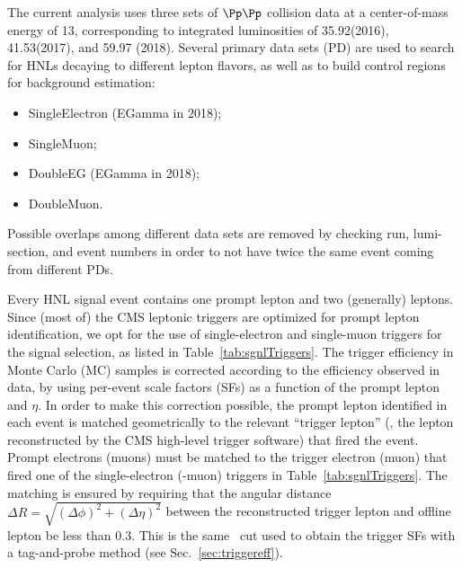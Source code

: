 The current analysis uses three sets of $\Pp\Pp$ collision data at a
center-of-mass energy of 13\TeV, corresponding to integrated
luminosities of 35.92\fbinv (2016), 41.53\fbinv (2017), and 59.97\fbinv
(2018). Several primary data sets (PD) are used to search for HNLs decaying
to different lepton flavors, as well as to build control regions for
background estimation:
\begin{itemize}
\item SingleElectron (EGamma in 2018);
\item SingleMuon;
\item DoubleEG (EGamma in 2018);
\item DoubleMuon.
\end{itemize}
Possible overlaps among different data sets are
removed by checking run, lumi-section, and event numbers in order to not have twice the same event coming from different PDs.

Every HNL signal event contains one prompt lepton and two (generally)
\displ leptons. Since (most of) the CMS leptonic triggers are
optimized for prompt lepton identification,
we opt for the use of single-electron and single-muon triggers for the
signal selection, as listed in Table~\ref{tab:sgnlTriggers}.
The trigger efficiency in  Monte Carlo (MC) samples is corrected
according to the efficiency observed in data, by using per-event scale
factors (SFs) as a function of the prompt lepton \pt and $\eta$.
In order to make this correction possible, the prompt lepton
identified in each event is matched geometrically to the relevant
``trigger lepton'' (\ie, the lepton reconstructed by the CMS
high-level trigger software) that fired the event. Prompt electrons
(muons) must be matched to the trigger electron (muon) that fired one
of the single-electron (-muon) triggers in
Table~\ref{tab:sgnlTriggers}.
The matching is ensured by requiring that the angular distance
\(\Delta R=\sqrt{\left(\Delta\phi\right)^2+\left(\Delta\eta\right)^2}\) 
between the reconstructed trigger lepton and offline lepton be less
than 0.3. This is the same \DR\ cut used to obtain the trigger SFs
with a tag-and-probe method (see Sec.~\ref{sec:triggereff}).

